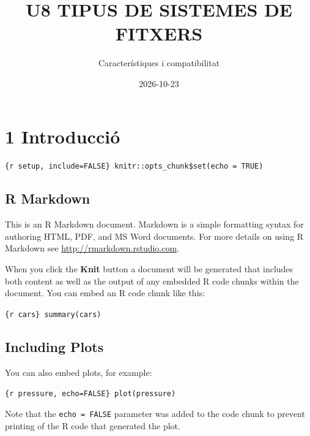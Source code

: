 \documentclass[
  spanish,
  12 pt,
  a4paper,
]{article}
\title{U8 TIPUS DE SISTEMES DE FITXERS}
\subtitle{Característiques i compatibilitat}
\author{}
\date{\vspace{-2.5em}2026-10-23}
\begin{document}
\maketitle

\newpage
\renewcommand\tablename{Tabla}

\section{1 Introducció}\label{introducciuxf3}

\texttt{\{r\ setup,\ include=FALSE\}\ knitr::opts\_chunk\$set(echo\ =\ TRUE)}

\subsection{R Markdown}\label{r-markdown}

This is an R Markdown document. Markdown is a simple formatting syntax
for authoring HTML, PDF, and MS Word documents. For more details on
using R Markdown see \url{http://rmarkdown.rstudio.com}.

When you click the \textbf{Knit} button a document will be generated
that includes both content as well as the output of any embedded R code
chunks within the document. You can embed an R code chunk like this:

\texttt{\{r\ cars\}\ summary(cars)}

\subsection{Including Plots}\label{including-plots}

You can also embed plots, for example:

\texttt{\{r\ pressure,\ echo=FALSE\}\ plot(pressure)}

Note that the \texttt{echo\ =\ FALSE} parameter was added to the code
chunk to prevent printing of the R code that generated the plot.
\end{document}
